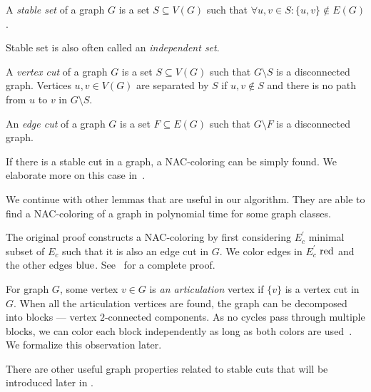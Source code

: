 %
\begin{definition}
	A \emph{stable set} of a graph \( G \) is a set \( S \subseteq V(G) \) such that
	\( \forall u, v \in S : \{u, v\} \not\in E(G) \).
\end{definition}
%
Stable set is also often called an \emph{independent set}.
%
\begin{definition}
	A \emph{vertex cut} of a graph \( G \) is a set \( S \subseteq V(G) \) such that
	\( G \setminus S \) is a disconnected graph.
	Vertices \( u, v \in V(G) \) are separated by \( S \)
	if \( u, v \not\in S \)
	and there is no path from \( u \) to \( v \) in \( G \setminus S \).
\end{definition}
%
\begin{definition}
	An \emph{edge cut} of a graph \( G \) is a set \( F \subseteq E(G) \) such that
	\( G \setminus F \) is a disconnected graph.
\end{definition}
%
%
If there is a stable cut in a graph, a NAC-coloring can be simply found.
We elaborate more on this case in~.

We continue with other lemmas that are useful in our algorithm.
They are able to find a NAC-coloring of a graph in polynomial time for some graph classes.
%
%
The original proof constructs a NAC-coloring by first considering
\( E_c^\prime \) minimal subset of \( E_c \)
such that it is also an edge cut in \( G \).
We color edges in \( E_c^\prime \) \( \text{red} \) and the other edges \( \text{blue} \).
See~\cite{legersky_original} for a complete proof.

For graph \( G \), some vertex \( v \in G \) is \emph{an articulation} vertex if
\( \{v\} \) is a vertex cut in \( G \).
When all the articulation vertices are found,
the graph can be decomposed into blocks
--- vertex \( 2 \)-connected components.
As no cycles pass through multiple blocks, we can color each block
independently as long as both colors are used~\cite{my_paper}.
We formalize this observation later.

There are other useful graph properties related to stable cuts
that will be introduced later in .

